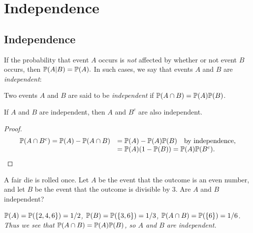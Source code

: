 \chapter{Independence}\label{chap:independence}

\section{Independence}
If the probability that event $A$ occurs is \emph{not} affected by whether or not event $B$ occurs, then
$
\mathbb{P}(A|B) = \mathbb{P}(A).
$
In such cases, we say that events $A$ and $B$ are \emph{independent}:

\begin{definition}
Two events $A$ and $B$ are said to be \emph{independent} if $\mathbb{P}(A\cap B) = \mathbb{P}(A)\mathbb{P}(B)$.
\end{definition}

\begin{lemma}
If $A$ and $B$ are independent, then $A$ and $B^c$ are also independent.
\begin{proof}
\[\begin{array}{ll}
\mathbb{P}(A\cap B^c) 
	= \mathbb{P}(A) - \mathbb{P}(A\cap B)
	& = \mathbb{P}(A) - \mathbb{P}(A)\mathbb{P}(B) \quad\text{by independence,} \\
	& = \mathbb{P}(A)(1-\mathbb{P}(B))
	= \mathbb{P}(A)\mathbb{P}(B^c).
\end{array}\]
\end{proof}
\end{lemma}

\begin{example}
A fair die is rolled once. Let $A$ be the event that the outcome is an even number, and let $B$ be the event that the outcome is divisible by $3$. Are $A$ and $B$ independent?
\begin{solution}
\bit
\it $\mathbb{P}(A) = \mathbb{P}(\{2,4,6\}) = 1/2$, $\mathbb{P}(B) = \mathbb{P}(\{3,6\}) = 1/3$, $\mathbb{P}(A\cap B) = \mathbb{P}(\{6\}) = 1/6$.
\it Thus we see that $\mathbb{P}(A\cap B) = \mathbb{P}(A)\mathbb{P}(B)$, so $A$ and $B$ are independent.
\eit
\end{solution}
\end{example}

